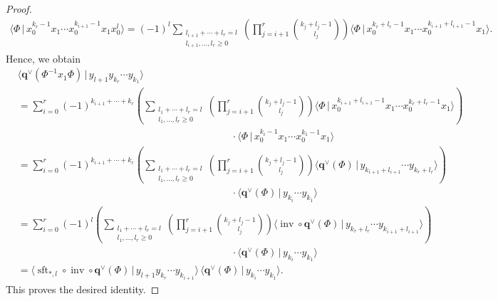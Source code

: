 \documentclass[15pt,oneside,reqno]{amsart}
\theoremstyle{remark}{
\newtheorem{lem}[df]{Lemma}
\newtheorem{prop}[df]{Proposition}
\newtheorem{ex}[df]{Example}
\newtheorem{rmk}[df]{Remark}
}
\DeclareMathOperator{\inv}{inv}
\DeclareMathOperator{\sft}{sft}
\begin{document}
\begin{proof}
{\begin{align*}
\bigl\langle\Phi \,\big|\, x_0^{k_r-1}x_1\cdots x_0^{k_{i+1}-1}x_1x_0^l  \bigr\rangle
=
(-1)^{l}\!\!\sum_{\substack{l_{i+1}+\cdots+l_r=l\\ l_{i+1},\ldots,l_r\ge0}}
\left(\prod_{j=i+1}^{r}\binom{k_j+l_j-1}{l_j}\right)
\bigl\langle \Phi \,\big|\, x_0^{k_{r}+l_{r}-1}x_1\cdots x_0^{k_{i+1}+l_{i+1}-1}x_1\bigr\rangle .
\end{align*}
}
Hence, we obtain
{\small
\begin{align*}
&\bigl\langle \mathbf{q}^{\vee}(\Phi^{-1}x_1\Phi)\,\big|\, y_{l+1}y_{k_r}\cdots y_{k_1}\bigr\rangle\\
&=
\sum_{i=0}^{r}
(-1)^{k_{i+1}+\cdots+k_r}
\left(
\sum_{\substack{l_1+\cdots+l_r=l\\ l_1,\ldots,l_r\ge0}}
\left(\prod_{j=i+1}^{r}\binom{k_j+l_j-1}{l_j}\right)
\bigl\langle \Phi \,\big|\, x_0^{k_{i+1}+l_{i+1}-1}x_1\cdots x_0^{k_r+l_r-1}x_1\bigr\rangle
\right) \\
&\hspace{9cm}\cdot
\bigl\langle \Phi\,\big|\, x_0^{k_i-1}x_1\cdots x_0^{k_1-1}x_1\bigr\rangle \\
&=
\sum_{i=0}^{r}
(-1)^{k_{i+1}+\cdots+k_r}
\left(
\sum_{\substack{l_1+\cdots+l_r=l\\ l_1,\ldots,l_r\ge0}}
\left(\prod_{j=i+1}^{r}\binom{k_j+l_j-1}{l_j}\right)
\bigl\langle \mathbf{q}^{\vee}(\Phi) \,\big|\,   y_{k_{i+1} + l_{i+1}}\cdots y_{k_r + l_r} \bigr\rangle
\right) \\
&\hspace{9cm}\cdot
\bigl\langle \mathbf{q}^{\vee}(\Phi)\,\big|\,  y_{k_i}\cdots y_{k_1}\bigr\rangle \\
&=
\sum_{i=0}^{r}
(-1)^l
\left(
\sum_{\substack{l_1+\cdots+l_r=l\\ l_1,\ldots,l_r\ge0}}
\left(\prod_{j=i+1}^{r}\binom{k_j+l_j-1}{l_j}\right)
\bigl\langle \inv \circ \mathbf{q}^{\vee}(\Phi) \,\big|\,   y_{k_r + l_r} \cdots y_{k_{i+1} + l_{i+1}} \bigr\rangle
\right) \\
&\hspace{9cm}\cdot
\bigl\langle \mathbf{q}^{\vee}(\Phi)\,\big|\,  y_{k_i}\cdots y_{k_1}\bigr\rangle \\
&=
\bigl\langle  \sft_{*,l}\circ  \inv \circ \mathbf{q}^{\vee}(\Phi)\,\big|\, y_{l+1}y_{k_r}\cdots y_{k_{i+1}}\bigr\rangle\,
\bigl\langle \mathbf{q}^{\vee}(\Phi)\,\big|\, y_{k_i}\cdots y_{k_1}\bigr\rangle .
\end{align*}
}
This proves the desired identity.
\end{proof}
\end{document}
